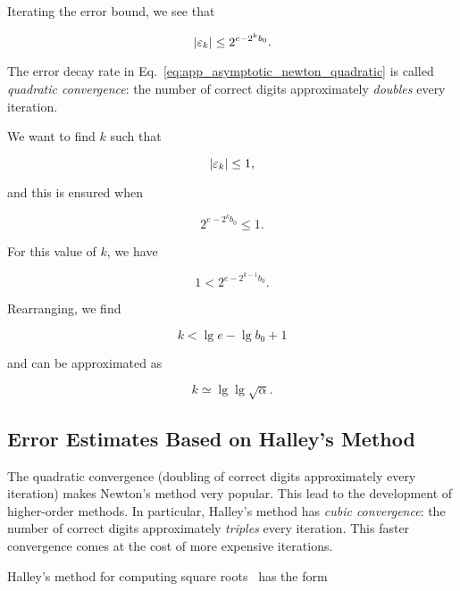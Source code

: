 \noindent
Iterating the error bound, we see that

\begin{equation}
    \left| \varepsilon_{k} \right| \le 2^{e-2^{k}b_{0}}.
    \label{eq:app_asymptotic_newton_quadratic}
\end{equation}

\noindent
The error decay rate in Eq.~\eqref{eq:app_asymptotic_newton_quadratic}
is called \emph{quadratic convergence}:
the number of correct digits approximately \emph{doubles}
every iteration.

We want to find $k$ such that

\begin{equation}
    \left| \varepsilon_{k} \right| \le 1,
\end{equation}

\noindent
and this is ensured when

\begin{equation}
    2^{e-2^{k}b_{0}} \le 1.
\end{equation}

\noindent
For this value of $k$, we have

\begin{equation}
    1 < 2^{e-2^{k-1}b_{0}}.
\end{equation}

\noindent
Rearranging, we find

\begin{equation}
    k < \lg e - \lg b_{0} + 1
\end{equation}

\noindent
and can be approximated as

\begin{equation}
    k \simeq \lg\lg \sqrt{\alpha}.
\end{equation}


\subsection{Error Estimates Based on Halley's Method}
\label{app_asymptotics:error_halley}

The quadratic convergence (doubling of correct digits
approximately every iteration) makes Newton's method very popular.
This lead to the development of higher-order methods.
In particular, Halley's method has \emph{cubic convergence}:
the number of correct digits approximately \emph{triples}
every iteration.
This faster convergence comes at the cost of more expensive iterations.

Halley's method for computing square roots~\cite[Section 2]{guo2010newton}
has the form

